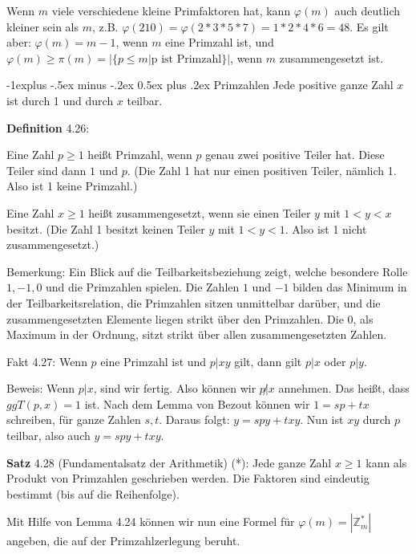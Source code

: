 \documentclass[a4paper]{article}
\makeatletter
\renewcommand{\subsection}{\@startsection{subsection}{2}{0mm}%
 {-1explus -.5ex minus -.2ex}%
 {0.5ex plus .2ex}%
 {\normalfont\normalsize\bfseries}}
\makeatother
\begin{document}
\begin{multicols}{3}
    Wenn $m$ viele verschiedene kleine Primfaktoren hat, kann $\varphi(m)$ auch deutlich kleiner sein als $m$, z.B. $\varphi(210) =\varphi(2*3*5*7)=1*2*4*6=48$. Es gilt aber: $\varphi(m) =m-1$, wenn $m$ eine Primzahl ist, und $\varphi(m)\geq \pi(m) =|\{p\leq m|\text{p ist Primzahl}\}|$, wenn $m$ zusammengesetzt ist.

    \subsection{Primzahlen}
    Jede positive ganze Zahl $x$ ist durch 1 und durch $x$ teilbar.

    \textbf{Definition} 4.26:
    \begin{enumerate*}
        \item Eine Zahl $p\geq 1$ heißt Primzahl, wenn $p$ genau zwei positive Teiler hat. Diese Teiler sind dann $1$ und $p$. (Die Zahl 1 hat nur einen positiven Teiler, nämlich 1. Also ist 1 keine Primzahl.)
        \item Eine Zahl $x\geq 1$ heißt zusammengesetzt, wenn sie einen Teiler $y$ mit $1<y < x$ besitzt. (Die Zahl 1 besitzt keinen Teiler $y$ mit $1<y<1$. Also ist 1 nicht zusammengesetzt.)
    \end{enumerate*}

    Bemerkung: Ein Blick auf die Teilbarkeitsbeziehung zeigt, welche besondere Rolle $1,-1, 0$ und die Primzahlen spielen. Die Zahlen $1$ und $-1$ bilden das Minimum in der Teilbarkeitsrelation, die Primzahlen sitzen unmittelbar darüber, und die zusammengesetzten Elemente liegen strikt über den Primzahlen. Die $0$, als Maximum in der Ordnung, sitzt strikt über allen zusammengesetzten Zahlen.

    Fakt 4.27: Wenn $p$ eine Primzahl ist und $p|xy$ gilt, dann gilt $p|x$ oder $p|y$.

    Beweis: Wenn $p|x$, sind wir fertig. Also können wir $p\not|x$ annehmen. Das heißt, dass $ggT(p,x) = 1$ ist. Nach dem Lemma von Bezout können wir $1 =sp+tx$ schreiben, für ganze Zahlen $s,t$. Daraus folgt: $y=spy+txy$. Nun ist $xy$ durch $p$ teilbar, also auch $y=spy+txy$.

    \textbf{Satz} 4.28 (Fundamentalsatz der Arithmetik) (*): Jede ganze Zahl $x\geq 1$ kann als Produkt von Primzahlen geschrieben werden. Die Faktoren sind eindeutig bestimmt (bis auf die Reihenfolge).

    Mit Hilfe von Lemma 4.24 können wir nun eine Formel für $\varphi(m) =|\mathbb{Z}^*_m|$ angeben, die auf der Primzahlzerlegung beruht.


\end{multicols}
\end{document}
